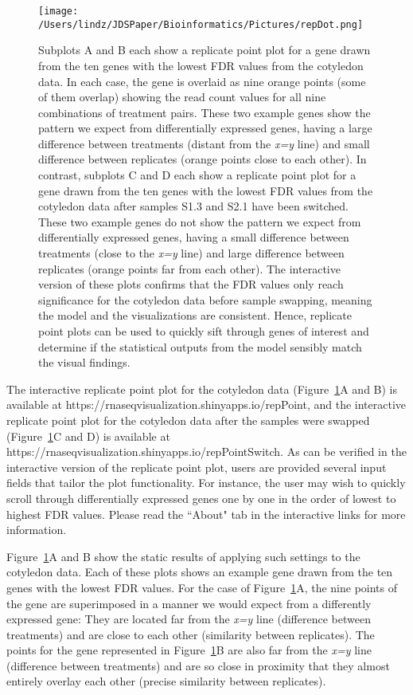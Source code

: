 \documentclass[referee]{biom}
\begin{document}
\begin{figure}
\begin{center}
\centerline{\texttt{[image: /Users/lindz/JDSPaper/Bioinformatics/Pictures/repDot.png]}}
\end{center}
\caption{Subplots A and B each show a replicate point plot for a gene drawn from the ten genes with the lowest FDR values from the cotyledon data. In each case, the gene is overlaid as nine orange points (some of them overlap) showing the read count values for all nine combinations of treatment pairs. These two example genes show the pattern we expect from differentially expressed genes, having a large difference between treatments (distant from the \textit{x=y} line) and small difference between replicates (orange points close to each other). In contrast, subplots C and D each show a replicate point plot for a gene drawn from the ten genes with the lowest FDR values from the cotyledon data after samples S1.3 and S2.1 have been switched. These two example genes do not show the pattern we expect from differentially expressed genes, having a small difference between treatments (close to the \textit{x=y} line) and large difference between replicates (orange points far from each other). The interactive version of these plots confirms that the FDR values only reach significance for the cotyledon data before sample swapping, meaning the model and the visualizations are consistent. Hence, replicate point plots can be used to quickly sift through genes of interest and determine if the statistical outputs from the model sensibly match the visual findings.
\label{repDot}}
\end{figure}

The interactive replicate point plot for the cotyledon data (Figure~\ref{repDot}A and B) is available at https://rnaseqvisualization.shinyapps.io/repPoint, and the interactive replicate point plot for the cotyledon data after the samples were swapped (Figure~\ref{repDot}C and D) is available at https://rnaseqvisualization.shinyapps.io/repPointSwitch. As can be verified in the interactive version of the replicate point plot, users are provided several input fields that tailor the plot functionality. For instance, the user may wish to quickly scroll through differentially expressed genes one by one in the order of lowest to highest FDR values. Please read the ``About" tab in the interactive links for more information.

Figure~\ref{repDot}A and B show the static results of applying such settings to the cotyledon data. Each of these plots shows an example gene drawn from the ten genes with the lowest FDR values. For the case of Figure~\ref{repDot}A, the nine points of the gene are superimposed in a manner we would expect from a differently expressed gene: They are located far from the \textit{x=y} line (difference between treatments) and are close to each other (similarity between replicates). The points for the gene represented in Figure~\ref{repDot}B are also far from the \textit{x=y} line (difference between treatments) and are so close in proximity that they almost entirely overlay each other (precise similarity between replicates).
\end{document}
